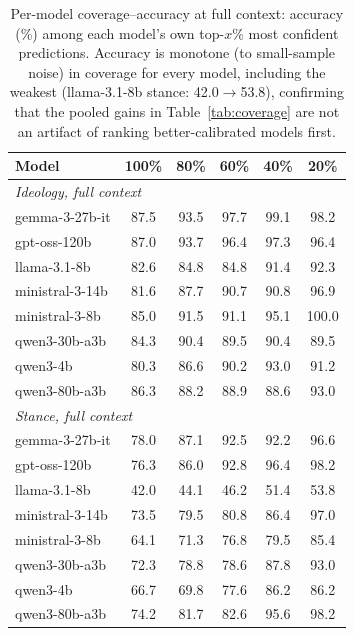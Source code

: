 \documentclass[11pt]{article}
\begin{document}
\begin{table}[h]
\centering
\small
\setlength{\tabcolsep}{3.2pt}
\begin{tabular}{lccccc}
\toprule
Model & 100\% & 80\% & 60\% & 40\% & 20\% \\
\midrule
\multicolumn{6}{l}{\emph{Ideology, full context}}\\
gemma-3-27b-it  & 87.5 & 93.5 & 97.7 & 99.1 & 98.2 \\
gpt-oss-120b    & 87.0 & 93.7 & 96.4 & 97.3 & 96.4 \\
llama-3.1-8b    & 82.6 & 84.8 & 84.8 & 91.4 & 92.3 \\
ministral-3-14b & 81.6 & 87.7 & 90.7 & 90.8 & 96.9 \\
ministral-3-8b  & 85.0 & 91.5 & 91.1 & 95.1 & 100.0 \\
qwen3-30b-a3b   & 84.3 & 90.4 & 89.5 & 90.4 & 89.5 \\
qwen3-4b        & 80.3 & 86.6 & 90.2 & 93.0 & 91.2 \\
qwen3-80b-a3b   & 86.3 & 88.2 & 88.9 & 88.6 & 93.0 \\
\midrule
\multicolumn{6}{l}{\emph{Stance, full context}}\\
gemma-3-27b-it  & 78.0 & 87.1 & 92.5 & 92.2 & 96.6 \\
gpt-oss-120b    & 76.3 & 86.0 & 92.8 & 96.4 & 98.2 \\
llama-3.1-8b    & 42.0 & 44.1 & 46.2 & 51.4 & 53.8 \\
ministral-3-14b & 73.5 & 79.5 & 80.8 & 86.4 & 97.0 \\
ministral-3-8b  & 64.1 & 71.3 & 76.8 & 79.5 & 85.4 \\
qwen3-30b-a3b   & 72.3 & 78.8 & 78.6 & 87.8 & 93.0 \\
qwen3-4b        & 66.7 & 69.8 & 77.6 & 86.2 & 86.2 \\
qwen3-80b-a3b   & 74.2 & 81.7 & 82.6 & 95.6 & 98.2 \\
\bottomrule
\end{tabular}
\caption{Per-model coverage--accuracy at full context: accuracy (\%) among each model's own top-$x\%$ most confident predictions. Accuracy is monotone (to small-sample noise) in coverage for every model, including the weakest (llama-3.1-8b stance: 42.0$\rightarrow$53.8), confirming that the pooled gains in Table~\ref{tab:coverage} are not an artifact of ranking better-calibrated models first.}
\label{tab:coverage_permodel}
\end{table}


\end{document}
